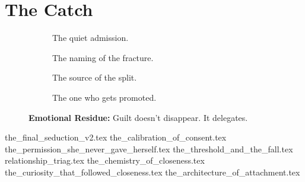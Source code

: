
\section{The Catch}

\vfill

\begin{figure}[H]
    \centering

    \begin{subfigure}[t]{0.45\textwidth}
    \centering
    \caption*{The quiet admission.}
    \end{subfigure}
    \hfill
    \begin{subfigure}[t]{0.45\textwidth}
    \centering
    \caption*{The naming of the fracture.}
    \end{subfigure}

    \vspace{1em}

    \begin{subfigure}[t]{0.45\textwidth}
    \centering
    \caption*{The source of the split.}
    \end{subfigure}
    \hfill
    \begin{subfigure}[t]{0.45\textwidth}
    \centering
    \caption*{The one who gets promoted.}
    \end{subfigure}

    \caption*{\textbf{Emotional Residue:} Guilt doesn't disappear. It delegates.}
\end{figure}


{the_final_seduction_v2.tex}
{the_calibration_of_consent.tex}
{the_permission_she_never_gave_herself.tex}
{the_threshold_and_the_fall.tex}
{relationship_triag.tex}
{the_chemistry_of_closeness.tex}
{the_curiosity_that_followed_closeness.tex}
{the_architecture_of_attachment.tex}